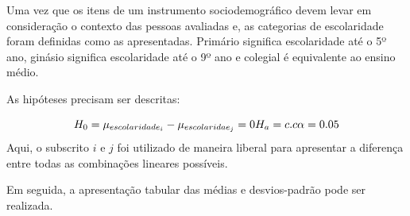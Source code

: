 \documentclass[
]{book}
\newenvironment{Shaded}{\begin{snugshade}}{\end{snugshade}}
\newcommand{\DataTypeTok}[1]{\textcolor[rgb]{0.13,0.29,0.53}{#1}}
\newcommand{\DecValTok}[1]{\textcolor[rgb]{0.00,0.00,0.81}{#1}}
\newcommand{\KeywordTok}[1]{\textcolor[rgb]{0.13,0.29,0.53}{\textbf{#1}}}
\newcommand{\NormalTok}[1]{#1}
\newcommand{\OperatorTok}[1]{\textcolor[rgb]{0.81,0.36,0.00}{\textbf{#1}}}
\newcommand{\StringTok}[1]{\textcolor[rgb]{0.31,0.60,0.02}{#1}}
\begin{document}
\begin{Shaded}
\end{Shaded}

Uma vez que os itens de um instrumento sociodemográfico devem levar em consideração o contexto das pessoas avaliadas e, as categorias de escolaridade foram definidas como as apresentadas. Primário significa escolaridade até o 5º ano, ginásio significa escolaridade até o 9º ano e colegial é equivalente ao ensino médio.

As hipóteses precisam ser descritas:

\[H_0 = \mu_{escolaridade_i} - \mu_{escolaridae_j} = 0 \\ H_a = c.c \\ \alpha = 0.05\]
Aqui, o subscrito \(i\) e \(j\) foi utilizado de maneira liberal para apresentar a diferença entre todas as combinações lineares possíveis.

Em seguida, a apresentação tabular das médias e desvios-padrão pode ser realizada.

\begin{Shaded}
\end{Shaded}
\end{document}
